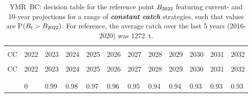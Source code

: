 \documentclass[11pt]{book}
\newcommand{\itbf}[1]{\textit{\textbf{#1}}}
\begin{document}
\begin{longtable}[c]{>{\raggedright\let\newline\\\arraybackslash\hspace{0pt}}p{0.52in}>{\raggedleft\let\newline\\\arraybackslash\hspace{0pt}}p{0.52in}>{\raggedleft\let\newline\\\arraybackslash\hspace{0pt}}p{0.52in}>{\raggedleft\let\newline\\\arraybackslash\hspace{0pt}}p{0.52in}>{\raggedleft\let\newline\\\arraybackslash\hspace{0pt}}p{0.52in}>{\raggedleft\let\newline\\\arraybackslash\hspace{0pt}}p{0.52in}>{\raggedleft\let\newline\\\arraybackslash\hspace{0pt}}p{0.52in}>{\raggedleft\let\newline\\\arraybackslash\hspace{0pt}}p{0.52in}>{\raggedleft\let\newline\\\arraybackslash\hspace{0pt}}p{0.52in}>{\raggedleft\let\newline\\\arraybackslash\hspace{0pt}}p{0.52in}>{\raggedleft\let\newline\\\arraybackslash\hspace{0pt}}p{0.52in}>{\raggedleft\let\newline\\\arraybackslash\hspace{0pt}}p{0.52in}}
  \caption{YMR~BC: decision table for the reference point $B_{2022}$ featuring current- and 10-year projections for a range of \itbf{constant catch} strategies, such that values are P$(B_t > B_{2022})$.  For reference, the average catch over the last 5 years (2016-2020) was 1272~t. } \label{tab:ymr.gmu.Bcurr.CCs}\\  \hline\\[-2.2ex]  CC  & 2022 & 2023 & 2024 & 2025 & 2026 & 2027 & 2028 & 2029 & 2030 & 2031 & 2032 \\[0.2ex]\hline\\[-1.5ex]  \endfirsthead   \hline  CC  & 2022 & 2023 & 2024 & 2025 & 2026 & 2027 & 2028 & 2029 & 2030 & 2031 & 2032 \\[0.2ex]\hline\\[-1.5ex]  \endhead  \hline\\[-2.2ex]   \endfoot  \hline \endlastfoot  0 & 0 & 0.99 & 0.98 & 0.97 & 0.96 & 0.95 & 0.94 & 0.94 & 0.93 & 0.93 & 0.93 \\ 

\end{longtable}
\end{document}
